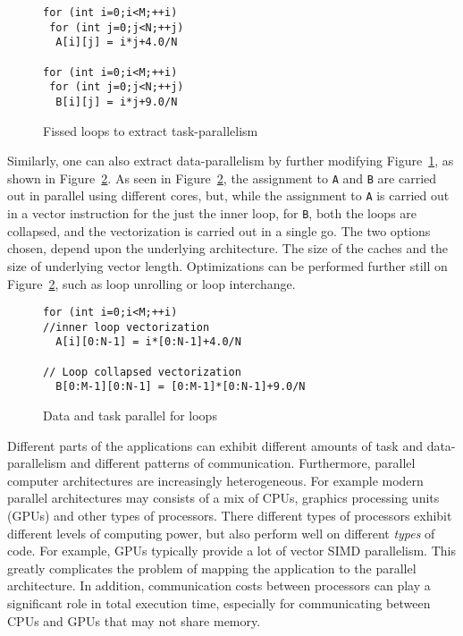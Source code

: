 \documentclass[10pt, conference, compsocconf]{IEEEtran}
\begin{document}
\begin{figure}[h!]
  \centering
  \small{
\begin{verbatim}
for (int i=0;i<M;++i)
 for (int j=0;j<N;++j)
  A[i][j] = i*j+4.0/N

for (int i=0;i<M;++i)
 for (int j=0;j<N;++j)
  B[i][j] = i*j+9.0/N
\end{verbatim}
  }
  
  \caption{Fissed loops to extract task-parallelism}
  \label{fig:2}
\end{figure}

Similarly, one can also extract data-parallelism by further modifying
Figure~\ref{fig:2}, as shown in Figure~\ref{fig:3}. As seen in
Figure~\ref{fig:3}, the assignment to \texttt{A} and \texttt{B} are
carried out in parallel using different cores, but, while the assignment
to \texttt{A} is carried out in a vector instruction for the just the
inner loop, for \texttt{B}, both the loops are collapsed, and the
vectorization is carried out in a single go. The two options chosen,
depend upon the underlying architecture. The size of the caches and the
size of underlying vector length. Optimizations can be performed further
still on Figure~\ref{fig:3}, such as loop unrolling or loop interchange.

\begin{figure}[h!]
  \centering
  \small{
\begin{verbatim}
for (int i=0;i<M;++i)
//inner loop vectorization
  A[i][0:N-1] = i*[0:N-1]+4.0/N

// Loop collapsed vectorization
  B[0:M-1][0:N-1] = [0:M-1]*[0:N-1]+9.0/N
\end{verbatim}
  }
  \caption{Data and task parallel for loops}
  \label{fig:3}
\end{figure}

Different parts of the applications can exhibit different amounts of task and
data-parallelism and different patterns of communication. Furthermore, parallel
computer architectures are 
increasingly heterogeneous. For example modern parallel architectures
may consists of a mix of CPUs, graphics processing units (GPUs) and
other types of processors. There different types of processors exhibit
different levels of computing power, but also perform well on
different \textit{types} of code. For example, GPUs typically provide
a lot of vector SIMD parallelism. This greatly complicates the problem
of mapping the application to the parallel architecture.  In addition,
communication costs between processors can play a significant role in
total execution time, especially for communicating between CPUs and
GPUs that may not share memory.
\end{document}

